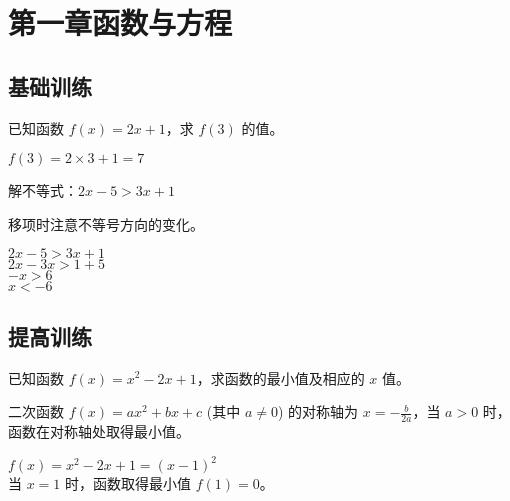 
\chapter{第一章\quad 函数与方程}

\section{基础训练}

\begin{exercise}{1}
已知函数 $f(x) = 2x + 1$，求 $f(3)$ 的值。
\end{exercise}

\begin{answer}
$f(3) = 2 \times 3 + 1 = 7$
\end{answer}

\begin{exercise}{2}
解不等式：$2x - 5 > 3x + 1$
\end{exercise}

\begin{hint}
移项时注意不等号方向的变化。
\end{hint}

\begin{answer}
$2x - 5 > 3x + 1$ \\
$2x - 3x > 1 + 5$ \\
$-x > 6$ \\
$x < -6$
\end{answer}

\section{提高训练}

\begin{importantexercise}{3}
已知函数 $f(x) = x^2 - 2x + 1$，求函数的最小值及相应的 $x$ 值。
\end{importantexercise}

\begin{knowledge}
二次函数 $f(x) = ax^2 + bx + c$ (其中 $a \neq 0$) 的对称轴为 $x = -\frac{b}{2a}$，当 $a > 0$ 时，函数在对称轴处取得最小值。
\end{knowledge}

\begin{answer}
$f(x) = x^2 - 2x + 1 = (x-1)^2$ \\
当 $x = 1$ 时，函数取得最小值 $f(1) = 0$。
\end{answer}

